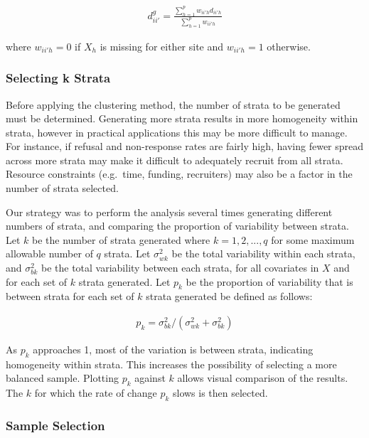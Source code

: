 \documentclass[man,floatsintext]{apa6}
\begin{document}
\begin{align}
  d^{g}_{ii'} = \frac{\sum^p_{h = 1}w_{ii'h}d_{ii'h}}{\sum^p_{h = 1}w_{ii'h}}
\end{align}

where \(w_{ii'h} = 0\) if \(X_h\) is missing for either site and \(w_{ii'h} = 1\) otherwise.

\hypertarget{selecting-k-strata}{%
\subsubsection{Selecting k Strata}\label{selecting-k-strata}}

Before applying the clustering method, the number of strata to be generated must be determined. Generating more strata results in more homogeneity within strata, however in practical applications this may be more difficult to manage. For instance, if refusal and non-response rates are fairly high, having fewer spread across more strata may make it difficult to adequately recruit from all strata. Resource constraints (e.g.~time, funding, recruiters) may also be a factor in the number of strata selected.

Our strategy was to perform the analysis several times generating different numbers of strata, and comparing the proportion of variability between strata. Let \(k\) be the number of strata generated where \(k = 1, 2, ..., q\) for some maximum allowable number of \(q\) strata. Let \(\sigma_{wk}^2\) be the total variability within each strata, and \(\sigma_{bk}^2\) be the total variability between each strata, for all covariates in \(X\) and for each set of \(k\) strata generated. Let \(p_k\) be the proportion of variability that is between strata for each set of \(k\) strata generated be defined as follows:

\begin{align} \label{eq:pk}
  p_k = \sigma_{bk}^2/(\sigma_{wk}^2 + \sigma_{bk}^2)
\end{align}

As \(p_k\) approaches 1, most of the variation is between strata, indicating homogeneity within strata. This increases the possibility of selecting a more balanced sample. Plotting \(p_k\) against \(k\) allows visual comparison of the results. The \(k\) for which the rate of change \(p_k\) slows is then selected.

\hypertarget{sample-selection}{%
\subsubsection{Sample Selection}\label{sample-selection}}
\end{document}

